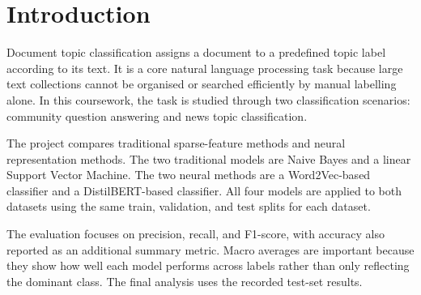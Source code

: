 \section{Introduction}

Document topic classification assigns a document to a predefined topic label according to its text. It is a core natural language processing task because large text collections cannot be organised or searched efficiently by manual labelling alone. In this coursework, the task is studied through two classification scenarios: community question answering and news topic classification.

The project compares traditional sparse-feature methods and neural representation methods. The two traditional models are Naive Bayes and a linear Support Vector Machine. The two neural methods are a Word2Vec-based classifier and a DistilBERT-based classifier. All four models are applied to both datasets using the same train, validation, and test splits for each dataset.

The evaluation focuses on precision, recall, and F1-score, with accuracy also reported as an additional summary metric. Macro averages are important because they show how well each model performs across labels rather than only reflecting the dominant class. The final analysis uses the recorded test-set results.

